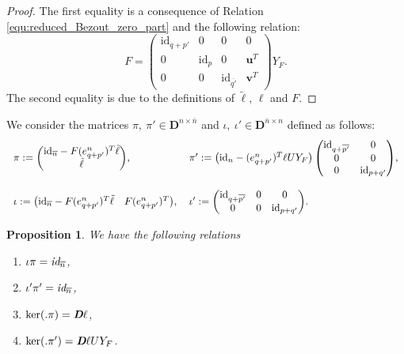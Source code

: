 \documentclass[10pt]{article}
\newtheorem{proposition}{Proposition}
\newcommand\g[1]{\textbf{#1}}
\newcommand\id[1]{\text{id}_{#1}}
\newcommand\idd[1]{\emph{id}_{#1}}
\newcommand\D{\g{D}}
\begin{document}
\begin{proof}
  The first equality is a consequence of Relation
  \eqref{equ:reduced_Bezout_zero_part} and the following relation:
  \[F=\begin{pmatrix}
  \id{q+p'} & 0 & 0 & 0\\
  0 & \id{p} & 0 & \g{u}^T\\
  0 & 0 & \id{\overline{q'}} & \g{v}^T
  \end{pmatrix}Y_F.
  \]
  The second equality is due to the definitions of $\tilde{\ell}$, $\ell$
  and $F$.
\end{proof}

We consider the matrices $\pi,\ \pi'\in\D^{n\times\overline{n}}$ and
$\iota,\ \iota'\in\D^{\overline{n}\times n}$ defined as follows:
\[\begin{tabular}{l l}
$\pi:=\begin{pmatrix}
\id{\overline{n}}-F(e^{n}_{q+p'})^T\tilde{\ell}\\
\tilde{\ell}
\end{pmatrix}$,
&
$\pi':=\left(\id{n}-(e^{n}_{q+p'})^T\ell UY_F\right)\begin{pmatrix}
  \id{q+\overline{p'}} & 0\\
  0 & 0\\
  0 & \id{p+q'}
\end{pmatrix}$,
\\
&
\\
$\iota:=\begin{pmatrix}
\id{\overline{n}}-F(e^{n}_{q+p'})^T\tilde{\ell} &
F(e^{n}_{q+p'})^T
\end{pmatrix}$,
&
$\iota':=\begin{pmatrix}
\id{q+\overline{p'}} & 0 & 0\\
0 & 0 & \id{p+q'}
\end{pmatrix}$.
\end{tabular}\]

\begin{proposition}\label{prop:exact_sequences_zero_part}
  We have the following relations
  \begin{multicols}{2}
    \begin{enumerate}
    \item\label{it:split_pi_zero_part} $\iota\pi=\idd{\overline{n}}$,
    \item\label{it:split_pip_zero_part} $\iota'\pi'=\idd{\overline{n}}$,
    \item\label{it:ker_pi_zero_part} $\ker(.\pi)=\emph{\D}\ell$,
    \item\label{it:ker_pip_zero_part} $\ker(.\pi')=\emph{\D}\ell UY_F$.
    \end{enumerate}
  \end{multicols}
\end{proposition}
\end{document}
